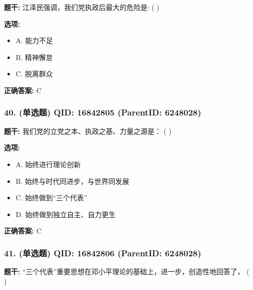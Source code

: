 \documentclass[12pt,UTF8]{ctexart}
\begin{document}
\textbf{题干:}
江泽民强调，我们党执政后最大的危险是: ( )



\textbf{选项:}
\begin{itemize}[leftmargin=*]

  \item A. 能力不足

  \item B. 精神懈怠

  \item C. 脱离群众

\end{itemize}

\textbf{正确答案:}
C

\vspace{0.3em}\hrulefill\vspace{0.7em}

\subsubsection*{40. (单选题) \small QID: 16842805 (ParentID: 6248028)}

\textbf{题干:}
我们党的立党之本、执政之基、力量之源是： ( )



\textbf{选项:}
\begin{itemize}[leftmargin=*]

  \item A. 始终进行理论创新

  \item B. 始终与时代同进步，与世界同发展

  \item C. 始终做到“三个代表”

  \item D. 始终做到独立自主、自力更生

\end{itemize}

\textbf{正确答案:}
C

\vspace{0.3em}\hrulefill\vspace{0.7em}

\subsubsection*{41. (单选题) \small QID: 16842806 (ParentID: 6248028)}

\textbf{题干:}
“三个代表”重要思想在邓小平理论的基础上，进一步，创造性地回答了， ( )
\end{document}
